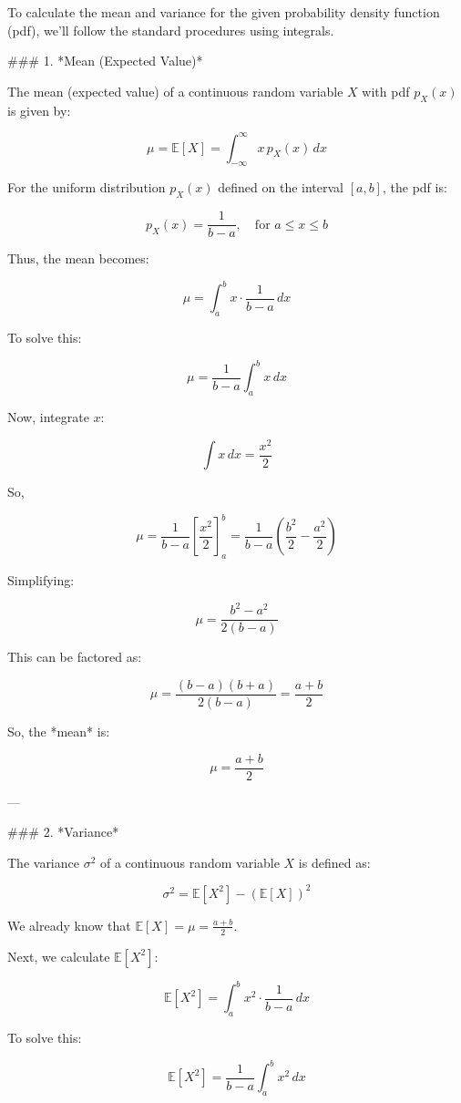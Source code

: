 To calculate the mean and variance for the given probability density function (pdf), we'll follow the standard procedures using integrals.

### 1. *Mean (Expected Value)*

The mean (expected value) of a continuous random variable \( X \) with pdf \( p_X(x) \) is given by:

\[
\mu = \mathbb{E}[X] = \int_{-\infty}^{\infty} x \, p_X(x) \, dx
\]

For the uniform distribution \( p_X(x) \) defined on the interval \([a, b]\), the pdf is:

\[
p_X(x) = \frac{1}{b - a}, \quad \text{for } a \leq x \leq b
\]

Thus, the mean becomes:

\[
\mu = \int_{a}^{b} x \cdot \frac{1}{b - a} \, dx
\]

To solve this:

\[
\mu = \frac{1}{b - a} \int_{a}^{b} x \, dx
\]

Now, integrate \( x \):

\[
\int x \, dx = \frac{x^2}{2}
\]

So,

\[
\mu = \frac{1}{b - a} \left[ \frac{x^2}{2} \right]_a^b = \frac{1}{b - a} \left( \frac{b^2}{2} - \frac{a^2}{2} \right)
\]

Simplifying:

\[
\mu = \frac{b^2 - a^2}{2(b - a)}
\]

This can be factored as:

\[
\mu = \frac{(b - a)(b + a)}{2(b - a)} = \frac{a + b}{2}
\]

So, the *mean* is:

\[
\mu = \frac{a + b}{2}
\]

---

### 2. *Variance*

The variance \( \sigma^2 \) of a continuous random variable \( X \) is defined as:

\[
\sigma^2 = \mathbb{E}[X^2] - (\mathbb{E}[X])^2
\]

We already know that \( \mathbb{E}[X] = \mu = \frac{a + b}{2} \).

Next, we calculate \( \mathbb{E}[X^2] \):

\[
\mathbb{E}[X^2] = \int_{a}^{b} x^2 \cdot \frac{1}{b - a} \, dx
\]

To solve this:

\[
\mathbb{E}[X^2] = \frac{1}{b - a} \int_{a}^{b} x^2 \, dx
\]

